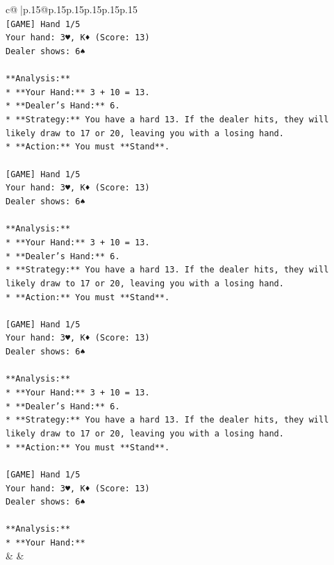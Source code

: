 \documentclass{article}
\begin{document}
{\begin{supertabular}{c@{$\;$}|p{.15\linewidth}@{}p{.15\linewidth}p{.15\linewidth}p{.15\linewidth}p{.15\linewidth}p{.15\linewidth}}
{{{\\ 
\texttt{{[}GAME{]} Hand 1/5} \\
\texttt{Your hand: 3♥, K♦ (Score: 13)} \\
\texttt{Dealer shows: 6♠} \\
\\ 
\texttt{**Analysis:**} \\
\texttt{*   **Your Hand:** 3 + 10 = 13.} \\
\texttt{*   **Dealer's Hand:** 6.} \\
\texttt{*   **Strategy:** You have a hard 13. If the dealer hits, they will likely draw to 17 or 20, leaving you with a losing hand.} \\
\texttt{*   **Action:** You must **Stand**.} \\
\\ 
\texttt{{[}GAME{]} Hand 1/5} \\
\texttt{Your hand: 3♥, K♦ (Score: 13)} \\
\texttt{Dealer shows: 6♠} \\
\\ 
\texttt{**Analysis:**} \\
\texttt{*   **Your Hand:** 3 + 10 = 13.} \\
\texttt{*   **Dealer's Hand:** 6.} \\
\texttt{*   **Strategy:** You have a hard 13. If the dealer hits, they will likely draw to 17 or 20, leaving you with a losing hand.} \\
\texttt{*   **Action:** You must **Stand**.} \\
\\ 
\texttt{{[}GAME{]} Hand 1/5} \\
\texttt{Your hand: 3♥, K♦ (Score: 13)} \\
\texttt{Dealer shows: 6♠} \\
\\ 
\texttt{**Analysis:**} \\
\texttt{*   **Your Hand:** 3 + 10 = 13.} \\
\texttt{*   **Dealer's Hand:** 6.} \\
\texttt{*   **Strategy:** You have a hard 13. If the dealer hits, they will likely draw to 17 or 20, leaving you with a losing hand.} \\
\texttt{*   **Action:** You must **Stand**.} \\
\\ 
\texttt{{[}GAME{]} Hand 1/5} \\
\texttt{Your hand: 3♥, K♦ (Score: 13)} \\
\texttt{Dealer shows: 6♠} \\
\\ 
\texttt{**Analysis:**} \\
\texttt{*   **Your Hand:**} \\
            }
        }
    }
    & & \\ \\


\end{supertabular}}
\end{document}
